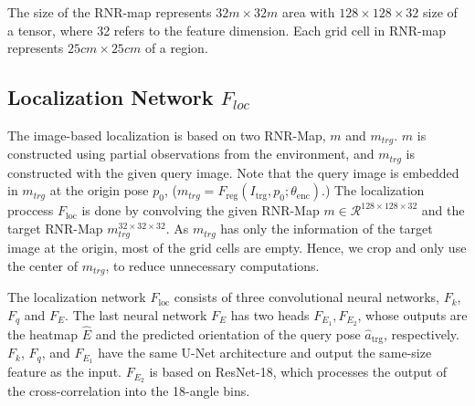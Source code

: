 \documentclass[10pt,twocolumn,letterpaper]{article}
\begin{document}
The size of the RNR-map represents $32m\times32m$ area with $128\times128\times32$ size of a tensor, where 32 refers to the feature dimension.
%
Each grid cell in RNR-map represents $25cm \times 25cm$ of a region.
%

\subsection{Localization Network $F_{loc}$}\label{appendix:impd:F_loc}
%
The image-based localization is based on two RNR-Map, $m$ and $m_{trg}$.
%
$m$ is constructed using partial observations from the environment, and $m_{trg}$ is constructed with the given query image.
%
Note that the query image is embedded in $m_{trg}$ at the origin pose $p_0$, ($m_{trg} = F_\mathrm{reg}(I_\mathrm{trg}, p_0 ; \theta_\mathrm{enc}).$)
%
The localization proccess $F_\mathrm{loc}$ is done by convolving the given RNR-Map $m\in\mathcal{R}^{128\times128\times32}$ and the target RNR-Map $m_{trg}^{32\times32\times32}$.
%
As $m_{trg}$ has only the information of the target image at the origin, most of the grid cells are empty.
%
Hence, we crop and only use the center of $m_{trg}$, to reduce unnecessary computations.


The localization network $F_\mathrm{loc}$ consists of three convolutional neural networks, $F_k$, $F_q$ and $F_E$.
%
The last neural network $F_E$ has two heads $F_{E_1}, F_{E_2}$, whose outputs are the heatmap $\hat{E}$ and the predicted orientation of the query pose $\hat{a}_\mathrm{trg}$, respectively.
%
$F_k$, $F_q$, and $F_{E_1}$ have the same U-Net architecture and output the same-size feature as the input.
%
$F_{E_2}$ is based on ResNet-18, which processes the output of the cross-correlation into the 18-angle bins. 
%
\end{document}
